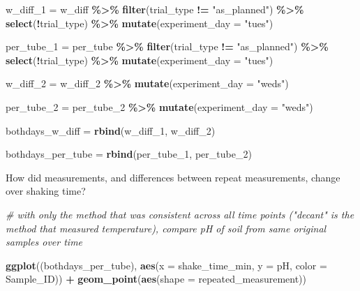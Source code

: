 \documentclass[
]{article}
\newenvironment{Shaded}{\begin{snugshade}}{\end{snugshade}}
\newcommand{\AttributeTok}[1]{\textcolor[rgb]{0.13,0.29,0.53}{#1}}
\newcommand{\CommentTok}[1]{\textcolor[rgb]{0.56,0.35,0.01}{\textit{#1}}}
\newcommand{\FunctionTok}[1]{\textcolor[rgb]{0.13,0.29,0.53}{\textbf{#1}}}
\newcommand{\NormalTok}[1]{#1}
\newcommand{\OtherTok}[1]{\textcolor[rgb]{0.56,0.35,0.01}{#1}}
\newcommand{\SpecialCharTok}[1]{\textcolor[rgb]{0.81,0.36,0.00}{\textbf{#1}}}
\newcommand{\StringTok}[1]{\textcolor[rgb]{0.31,0.60,0.02}{#1}}
\begin{document}
\begin{Shaded}
\begin{Highlighting}[]
\NormalTok{w\_diff\_1 }\OtherTok{=}\NormalTok{ w\_diff }\SpecialCharTok{\%\textgreater{}\%}
  \FunctionTok{filter}\NormalTok{(trial\_type }\SpecialCharTok{!=} \StringTok{"as\_planned"}\NormalTok{) }\SpecialCharTok{\%\textgreater{}\%}
  \FunctionTok{select}\NormalTok{(}\SpecialCharTok{!}\NormalTok{trial\_type) }\SpecialCharTok{\%\textgreater{}\%}
  \FunctionTok{mutate}\NormalTok{(}\AttributeTok{experiment\_day =} \StringTok{"tues"}\NormalTok{)}

\NormalTok{per\_tube\_1 }\OtherTok{=}\NormalTok{ per\_tube }\SpecialCharTok{\%\textgreater{}\%}
  \FunctionTok{filter}\NormalTok{(trial\_type }\SpecialCharTok{!=} \StringTok{"as\_planned"}\NormalTok{) }\SpecialCharTok{\%\textgreater{}\%}
  \FunctionTok{select}\NormalTok{(}\SpecialCharTok{!}\NormalTok{trial\_type) }\SpecialCharTok{\%\textgreater{}\%}
  \FunctionTok{mutate}\NormalTok{(}\AttributeTok{experiment\_day =} \StringTok{"tues"}\NormalTok{)}

\NormalTok{w\_diff\_2 }\OtherTok{=}\NormalTok{ w\_diff\_2 }\SpecialCharTok{\%\textgreater{}\%}
  \FunctionTok{mutate}\NormalTok{(}\AttributeTok{experiment\_day =} \StringTok{"weds"}\NormalTok{)}

\NormalTok{per\_tube\_2 }\OtherTok{=}\NormalTok{ per\_tube\_2 }\SpecialCharTok{\%\textgreater{}\%}
  \FunctionTok{mutate}\NormalTok{(}\AttributeTok{experiment\_day =} \StringTok{"weds"}\NormalTok{)}

\NormalTok{bothdays\_w\_diff }\OtherTok{=} \FunctionTok{rbind}\NormalTok{(w\_diff\_1, w\_diff\_2)}

\NormalTok{bothdays\_per\_tube }\OtherTok{=} \FunctionTok{rbind}\NormalTok{(per\_tube\_1, per\_tube\_2)}
\end{Highlighting}
\end{Shaded}

How did measurements, and differences between repeat measurements,
change over shaking time?

\begin{Shaded}
\begin{Highlighting}[]
\CommentTok{\# with only the method that was consistent across all time points ("decant" is the method that measured temperature), compare pH of soil from same original samples over time}

\FunctionTok{ggplot}\NormalTok{((bothdays\_per\_tube), }\FunctionTok{aes}\NormalTok{(}\AttributeTok{x =}\NormalTok{ shake\_time\_min, }\AttributeTok{y =}\NormalTok{ pH, }\AttributeTok{color =}\NormalTok{ Sample\_ID)) }\SpecialCharTok{+} 
  \FunctionTok{geom\_point}\NormalTok{(}\FunctionTok{aes}\NormalTok{(}\AttributeTok{shape =}\NormalTok{ repeated\_measurement))}
\end{Highlighting}
\end{Shaded}
\end{document}
